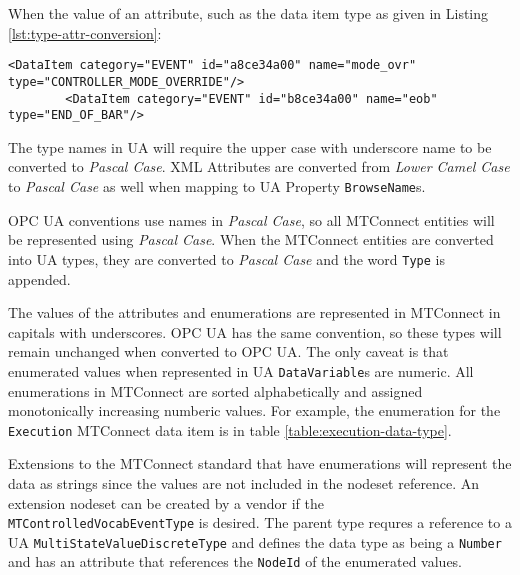 When the value of an attribute, such as the data item type as given in Listing \ref{lst:type-attr-conversion}:

\begin{lstlisting}[firstnumber=1,%
    caption={\texttt{DataItem} \texttt{type} Attribtue Conversion}, label={lst:type-attr-conversion}]
        <DataItem category="EVENT" id="a8ce34a00" name="mode_ovr" type="CONTROLLER_MODE_OVERRIDE"/>
        <DataItem category="EVENT" id="b8ce34a00" name="eob" type="END_OF_BAR"/>
\end{lstlisting}

The type names in UA will require the upper case with underscore name to be converted to \textit{Pascal Case}. XML Attributes are converted from \textit{Lower Camel Case} to \textit{Pascal Case} as well when mapping to UA Property \texttt{BrowseName}s.

OPC UA conventions use names in \textit{Pascal Case}, so all MTConnect entities will be represented using \textit{Pascal Case}. When the MTConnect entities are converted into UA types, they are converted to \textit{Pascal Case} and the word \texttt{Type} is appended. 

The values of the attributes and enumerations are represented in MTConnect in capitals with underscores. OPC UA has the same convention, so these types will remain unchanged when converted to OPC UA. The only caveat is that enumerated values when represented in UA \texttt{DataVariable}s are numeric. All enumerations in MTConnect are sorted alphabetically and assigned monotonically increasing numberic values. For example, the enumeration for the \texttt{Execution} MTConnect data item is in table \ref{table:execution-data-type}.

Extensions to the MTConnect standard that have enumerations will represent the data as strings since the values are not included in the nodeset reference. An extension nodeset can be created by a vendor if the \texttt{MTControlled\-Vocab\-EventType} is desired. The parent type requres a reference to a UA \texttt{MultiState\-Value\-Discrete\-Type} and defines the data type as being a \texttt{Number} and has an attribute that references the \texttt{NodeId} of the enumerated values.

